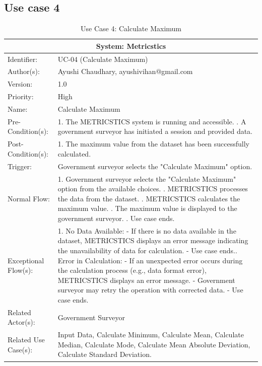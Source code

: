 \begin{table}[h]
\subsection*{Use case 4}
\begin{tabular}{ | p{4cm} | p{10cm} | }
 \hline
 \multicolumn{2}{|c|}{System: Metricstics} \\
 \hline
 Identifier: & UC-04 (Calculate Maximum)  \\
 \hline
 Author(s): & Ayushi Chaudhary, ayushivihan@gmail.com    \\
 \hline
 Version: & 1.0	\\
 \hline
 Priority: & High	\\
 \hline
 Name: & Calculate Maximum \\
 \hline
 Pre-Condition(s):  & {1. The METRICSTICS system is running and accessible. \newline 2. A government surveyor has initiated a session and provided data.  }\\
 \hline
 Post-Condition(s):  & {1. The maximum value from the dataset has been successfully calculated.  }\\
 \hline
 Trigger: & Government surveyor selects the "Calculate Maximum" option.  \\
 \hline
 Normal Flow:  & {1. Government surveyor selects the "Calculate Maximum" option from the available choices. \newline 2. METRICSTICS processes the data from the dataset. \newline 3. METRICSTICS calculates the maximum value. \newline 4. The maximum value is displayed to the government surveyor. \newline 5. Use case ends.}\\
 \hline
 Exceptional Flow(s):  & {1. No Data Available: \newline
   - If there is no data available in the dataset, METRICSTICS displays an error message indicating the unavailability of data for calculation.\newline
   - Use case ends.\newline
   2. Error in Calculation: \newline
   - If an unexpected error occurs during the calculation process (e.g., data format error), METRICSTICS displays an error message. \newline
   - Government surveyor may retry the operation with corrected data. \newline
   - Use case ends.}\\
 \hline
 Related Actor(s): & Government Surveyor\\
 \hline
 Related Use Case(s): & Input Data, Calculate Minimum, Calculate Mean, Calculate Median, Calculate Mode, Calculate Mean Absolute Deviation, Calculate Standard Deviation.\\
 \hline
 \end{tabular}
\renewcommand{\thetable}{\arabic{table}}
\caption{Use Case 4: Calculate Maximum}
\label{tab:table1}
\end{table}

